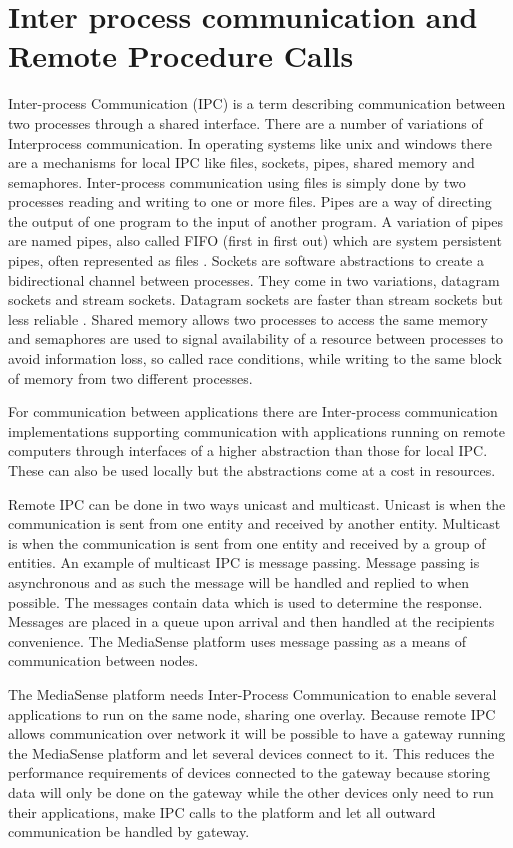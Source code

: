 \section{Inter process communication and Remote Procedure Calls}
Inter-process Communication (IPC) is a term describing communication between two processes through a shared interface. There are a number of variations of Interprocess communication. In operating systems like unix and windows there are a mechanisms for local IPC like files, sockets, pipes, shared memory and semaphores. 
Inter-process communication using files is simply done by two processes reading and writing to one or more files. Pipes are a way of directing the output of one program to the input of another program. A variation of pipes are named pipes, also called FIFO (first in first out) which are system persistent pipes, often represented as files \cite{Lewandowski97interprocesscommunication}. Sockets are software abstractions to create a bidirectional channel between processes. They come in two variations, datagram sockets and stream sockets. Datagram sockets are faster than stream sockets but less reliable \cite{Lewandowski97interprocesscommunication}. Shared memory allows two processes to access the same memory and semaphores are used to signal availability of a resource between processes to avoid information loss, so called race conditions, while writing to the same block of memory from two different processes.

For communication between applications there are Inter-process communication implementations supporting communication with applications running on remote computers through interfaces of a higher abstraction than those for local IPC. These can also be used locally but the abstractions come at a cost in resources.

Remote IPC can be done in two ways unicast and multicast. Unicast is when the communication is sent from one entity and received by another entity. Multicast is when the communication is sent from one entity and received by a group of entities.
An example of multicast IPC is message passing. Message passing is asynchronous and as such the message will be handled and replied to when possible. The messages contain data which is used to determine the response. Messages are placed in a queue upon arrival and then handled at the recipients convenience. The MediaSense platform uses message passing as a means of communication between nodes.

The MediaSense platform needs Inter-Process Communication to enable several applications to run on the same node, sharing one overlay. Because remote IPC allows communication over network it will be possible to have a gateway \cite{Fowler:2002:PEA:579257} running the MediaSense platform and let several devices connect to it. This reduces the performance requirements of devices connected to the gateway because storing data will only be done on the gateway while the other devices only need to run their applications, make IPC calls to the platform and let all outward communication be handled by gateway.

